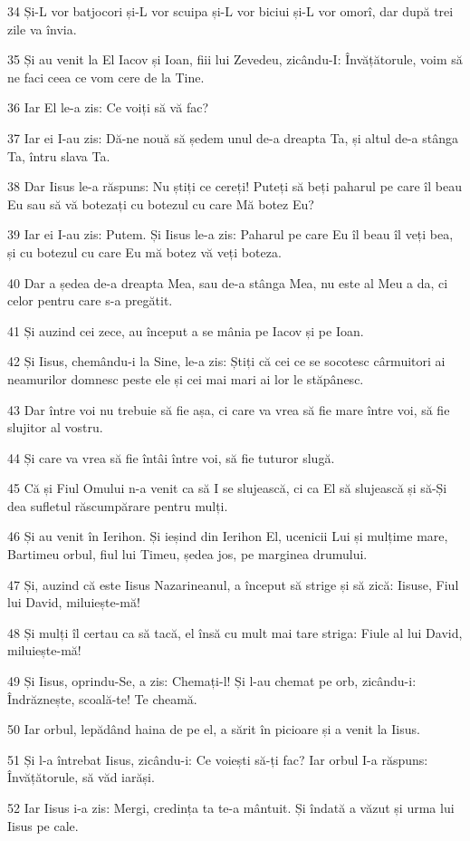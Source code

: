 \par 34 Și-L vor batjocori și-L vor scuipa și-L vor biciui și-L vor omorî, dar după trei zile va învia.
\par 35 Și au venit la El Iacov și Ioan, fiii lui Zevedeu, zicându-I: Învățătorule, voim să ne faci ceea ce vom cere de la Tine.
\par 36 Iar El le-a zis: Ce voiți să vă fac?
\par 37 Iar ei I-au zis: Dă-ne nouă să ședem unul de-a dreapta Ta, și altul de-a stânga Ta, întru slava Ta.
\par 38 Dar Iisus le-a răspuns: Nu știți ce cereți! Puteți să beți paharul pe care îl beau Eu sau să vă botezați cu botezul cu care Mă botez Eu?
\par 39 Iar ei I-au zis: Putem. Și Iisus le-a zis: Paharul pe care Eu îl beau îl veți bea, și cu botezul cu care Eu mă botez vă veți boteza.
\par 40 Dar a ședea de-a dreapta Mea, sau de-a stânga Mea, nu este al Meu a da, ci celor pentru care s-a pregătit.
\par 41 Și auzind cei zece, au început a se mânia pe Iacov și pe Ioan.
\par 42 Și Iisus, chemându-i la Sine, le-a zis: Știți că cei ce se socotesc cârmuitori ai neamurilor domnesc peste ele și cei mai mari ai lor le stăpânesc.
\par 43 Dar între voi nu trebuie să fie așa, ci care va vrea să fie mare între voi, să fie slujitor al vostru.
\par 44 Și care va vrea să fie întâi între voi, să fie tuturor slugă.
\par 45 Că și Fiul Omului n-a venit ca să I se slujească, ci ca El să slujească și să-Și dea sufletul răscumpărare pentru mulți.
\par 46 Și au venit în Ierihon. Și ieșind din Ierihon El, ucenicii Lui și mulțime mare, Bartimeu orbul, fiul lui Timeu, ședea jos, pe marginea drumului.
\par 47 Și, auzind că este Iisus Nazarineanul, a început să strige și să zică: Iisuse, Fiul lui David, miluiește-mă!
\par 48 Și mulți îl certau ca să tacă, el însă cu mult mai tare striga: Fiule al lui David, miluiește-mă!
\par 49 Și Iisus, oprindu-Se, a zis: Chemați-l! Și l-au chemat pe orb, zicându-i: Îndrăznește, scoală-te! Te cheamă.
\par 50 Iar orbul, lepădând haina de pe el, a sărit în picioare și a venit la Iisus.
\par 51 Și l-a întrebat Iisus, zicându-i: Ce voiești să-ți fac? Iar orbul I-a răspuns: Învățătorule, să văd iarăși.
\par 52 Iar Iisus i-a zis: Mergi, credința ta te-a mântuit. Și îndată a văzut și urma lui Iisus pe cale.

